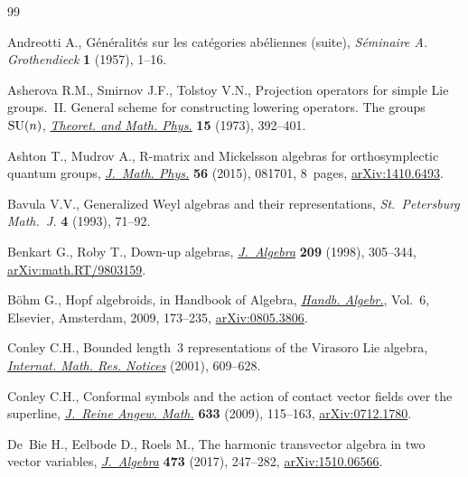 \begin{thebibliography}{99}
\footnotesize\itemsep=0pt

Andreotti A., G\'en\'eralit\'es sur les cat\'egories ab\'eliennes (suite),
 \textit{S\'eminaire A. Grothendieck} \textbf{1} (1957), 1--16.

Asherova R.M., Smirnov J.F., Tolstoy V.N., Projection operators for simple
 {L}ie groups.~{II}. {G}eneral scheme for constructing lowering operators.
 {T}he groups~{${\rm SU}(n)$}, \href{https://doi.org/10.1007/BF01028268}{\textit{Theoret. and Math. Phys.}} \textbf{15}
 (1973), 392--401.

Ashton T., Mudrov A., R-matrix and {M}ickelsson algebras for orthosymplectic
 quantum groups, \href{https://doi.org/10.1063/1.4927582}{\textit{J.~Math. Phys.}} \textbf{56} (2015), 081701, 8~pages,
 \href{https://arxiv.org/abs/1410.6493}{arXiv:1410.6493}.

Bavula V.V., Generalized {W}eyl algebras and their representations,
 \textit{St.~Petersburg Math.~J.} \textbf{4} (1993), 71--92.

Benkart G., Roby T., Down-up algebras, \href{https://doi.org/10.1006/jabr.1998.7511}{\textit{J.~Algebra}} \textbf{209} (1998),
 305--344, \href{https://arxiv.org/abs/math.RT/9803159}{arXiv:math.RT/9803159}.

B\"ohm G., Hopf algebroids, in Handbook of {A}lgebra, \href{https://doi.org/10.1016/S1570-7954(08)00205-2}{\textit{Handb. Algebr.}},
 Vol.~6, Elsevier, Amsterdam, 2009, 173--235, \href{https://arxiv.org/abs/0805.3806}{arXiv:0805.3806}.

Conley C.H., Bounded length~3 representations of the {V}irasoro {L}ie algebra,
 \href{https://doi.org/10.1155/S1073792801000320}{\textit{Internat. Math. Res. Notices}} (2001), 609--628.

Conley C.H., Conformal symbols and the action of contact vector fields over the
 superline, \href{https://doi.org/10.1515/CRELLE.2009.062}{\textit{J.~Reine Angew. Math.}} \textbf{633} (2009), 115--163,
 \href{https://arxiv.org/abs/0712.1780}{arXiv:0712.1780}.

De~Bie H., Eelbode D., Roels M., The harmonic transvector algebra in two vector
 variables, \href{https://doi.org/10.1016/j.jalgebra.2016.10.039}{\textit{J.~Algebra}} \textbf{473} (2017), 247--282,
 \href{https://arxiv.org/abs/1510.06566}{arXiv:1510.06566}.


\end{thebibliography}
